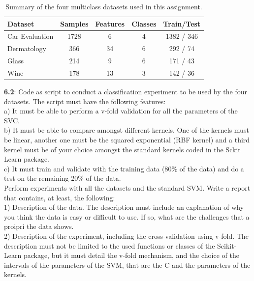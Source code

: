 \documentclass[11pt]{article}
\begin{document}
	\begin{table}[H]
		\centering
		\renewcommand{\arraystretch}{1.1}
		\begin{tabular}{lcccc}
			\toprule
			\textbf{Dataset} & \textbf{Samples} & \textbf{Features} & \textbf{Classes} & \textbf{Train/Test} \\
			\midrule
			Car Evaluation & 1728 & 6  & 4 & 1382 / 346 \\
			Dermatology    & 366  & 34 & 6 & 292 / 74 \\
			Glass          & 214  & 9  & 6 & 171 / 43 \\
			Wine           & 178  & 13 & 3 & 142 / 36 \\
			\bottomrule
		\end{tabular}
		\caption{Summary of the four multiclass datasets used in this assignment.}
	\end{table}
	
	\newpage
	\textbf{6.2}: Code as script to conduct a classification experiment to be used by the four datasets. The script must have the following features:\\
	
	a) It must be able to perform a v-fold validation for all the parameters of the SVC.\\
	
	b) It must be able to compare amongst different kernels. One of the kernels must be linear, another one must be the squared exponential (RBF kernel) and a third kernel must be of your choice amongst the standard kernels coded in the Sckit Learn package.\\
	
	c) It must train and validate with the training data (80\% of the data) and do a test on the remaining 20\% of the data.\\
	
	Perform experiments with all the datasets and the standard SVM. Write a report that contains, at least, the following:\\
	
	1) Description of the data. The description must include an explanation of why you think the data is easy or difficult to use. If so, what are the challenges that a proipri the data shows.\\
	
	2) Description of the experiment, including the cross-validation using v-fold. The description must not be limited to the used functions or classes of the Scikit-Learn package, but it must detail the v-fold mechanism, and the choice of the intervals of the parameters of the SVM, that are the C and the parameters of the kernels.\\
	
\end{document}
